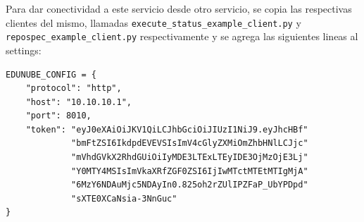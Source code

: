 Para dar conectividad a este servicio desde otro servicio, se copia las respectivas clientes del mismo, llamadas \texttt{execute\_status\_example\_client.py} y \\
\texttt{repospec\_example\_client.py} respectivamente y se agrega las siguientes lineas al settings:
\lstset{language=Python}
\begin{lstlisting}
EDUNUBE_CONFIG = {
    "protocol": "http",
    "host": "10.10.10.1",
    "port": 8010,
    "token": "eyJ0eXAiOiJKV1QiLCJhbGciOiJIUzI1NiJ9.eyJhcHBf"
             "bmFtZSI6IkdpdEVEVSIsImV4cGlyZXMiOmZhbHNlLCJjc"
             "mVhdGVkX2RhdGUiOiIyMDE3LTExLTEyIDE3OjMzOjE3Lj"
             "Y0MTY4MSIsImVkaXRfZGF0ZSI6IjIwMTctMTEtMTIgMjA"
             "6MzY6NDAuMjc5NDAyIn0.825oh2rZUlIPZFaP_UbYPDpd"
             "sXTE0XCaNsia-3NnGuc"
}
\end{lstlisting}


